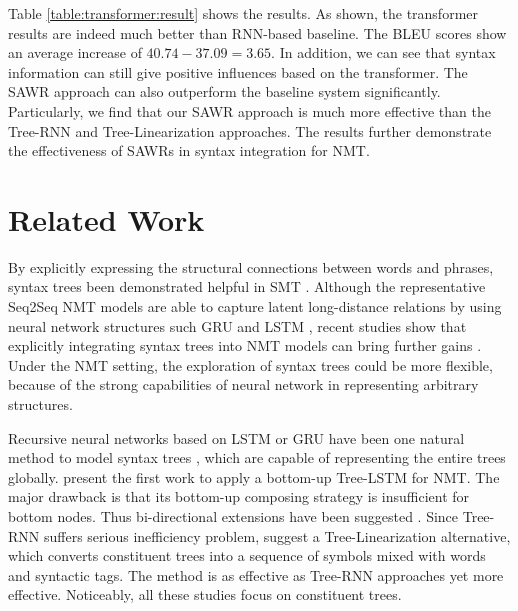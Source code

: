 \documentclass[11pt,a4paper]{article}
\begin{document}
\begin{CJK}{UTF8}{gbsn}
Table \ref{table:transformer:result} shows the results.
As shown, the transformer results are indeed much better than RNN-based baseline.
The BLEU scores show an average increase of $40.74 - 37.09 = 3.65$.
In addition, we can see that syntax information can still give positive influences based on the transformer.
The SAWR approach can also outperform the baseline system significantly.
Particularly, we find that our SAWR approach is much more effective than the Tree-RNN and Tree-Linearization approaches.
The results further demonstrate the effectiveness of SAWRs in syntax integration for NMT.






\section{Related Work}
By explicitly expressing the structural connections between words and phrases,
syntax trees  been demonstrated helpful in SMT \cite{liu-liu-lin:2006:COLACL,cowan-kuucerova-collins:2006:EMNLP,marton-resnik:2008:ACLMain,xie-mi-liu:2011:EMNLP,li-resnik-daumeiii:2013:NAACL-HLT,williams2016syntax}.
Although the representative Seq2Seq NMT models are able to capture latent long-distance relations
by using neural network structures such GRU and LSTM \cite{sutskever2014sequence,wu2016google},
recent studies show that explicitly integrating syntax trees into NMT models can bring further gains \cite{sennrich-haddow:2016:WMT,shi-padhi-knight:2016:EMNLP2016,zhou-EtAl:2017:Short2,wu-EtAl:2017:Long2,aharoni-goldberg:2017:Short}.
Under the NMT setting,
the exploration of syntax trees could be more flexible,
because of the strong capabilities of neural network in representing arbitrary structures.


Recursive neural networks based on LSTM or GRU have been one natural method to model syntax trees \cite{zhu2015long,tai-socher-manning:2015:ACL-IJCNLP,li-EtAl:2015:EMNLP5,zhang-lu-lapata:2016:N16-1,teng2016bidirectional,miwa-bansal:2016:P16-1,kokkinos-potamianos:2017:EACLshort},
which are capable of representing the entire trees globally.
 present the first work to apply a bottom-up Tree-LSTM for NMT.
The major drawback is that its bottom-up composing strategy is insufficient for bottom nodes.
Thus bi-directional extensions have been suggested \cite{chen-EtAl:2017:Long6,yang-EtAl:2017:EMNLP20172}.
Since Tree-RNN suffers serious inefficiency problem,
 suggest a Tree-Linearization alternative,
which converts constituent trees into a sequence of symbols mixed with words and syntactic tags.
The method is as effective as Tree-RNN approaches yet more effective.
Noticeably, all these studies focus on constituent trees.



\end{CJK}
\end{document}
